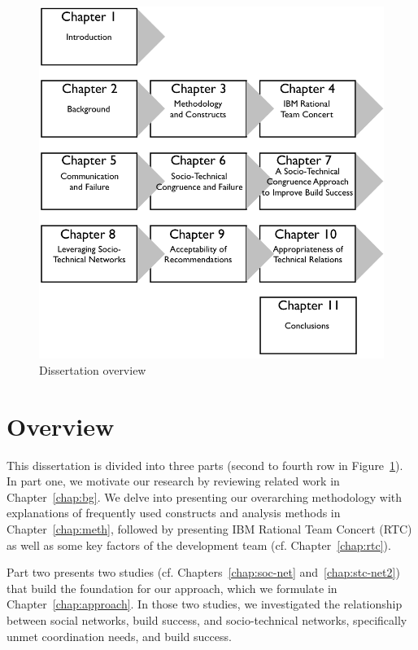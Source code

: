 \begin{figure}[t]
\centering
\includegraphics[width=.87\columnwidth]{figures/dis-over}
\caption{Dissertation overview}
\label{fig:over}
\end{figure}

\section{Overview}
This dissertation is divided into three parts (second to fourth row in Figure~\ref{fig:over}).
In part one, we motivate our research by reviewing related work in Chapter~\ref{chap:bg}.
We delve into presenting our overarching methodology with explanations of frequently used constructs and analysis methods in Chapter~\ref{chap:meth}, followed by presenting IBM Rational Team Concert (RTC) as well as some key factors of the development team (cf. Chapter~\ref{chap:rtc}).

Part two presents two studies (cf. Chapters~\ref{chap:soc-net} and~\ref{chap:stc-net2}) that build the foundation for our approach, which we formulate in Chapter~\ref{chap:approach}.
In those two studies, we investigated the relationship between social networks, build success, and socio-technical networks, specifically unmet coordination needs, and build success.

